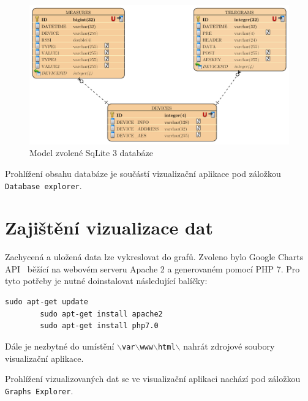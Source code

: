 \begin{figure}[!ht]
  \begin{center}
    \includegraphics[scale=0.55]{obrazky/aplikace_databaze}
  \end{center}
	\vspace{-10pt}
  \caption{Model zvolené SqLite 3 databáze}
	\label{databazovy_model}
\end{figure}

Prohlížení obsahu databáze je součástí vizualizační aplikace pod záložkou \texttt{Database explorer}.
	
\section{Zajištění vizualizace dat}	
\label{SectionVizualizaceDat}
Zachycená a uložená data lze vykreslovat do grafů. Zvoleno bylo Google Charts API~\cite{uvod_google_charts_api} běžící na webovém serveru Apache 2 a generovaném pomocí PHP 7. Pro tyto potřeby je nutné doinstalovat následující balíčky:
 
\begin{lstlisting}[style=MyCodeBash]
		sudo apt-get update
		sudo apt-get install apache2
		sudo apt-get install php7.0 
	\end{lstlisting}

Dále je nezbytné do umístění \texttt{$\backslash$var$\backslash$www$\backslash$html$\backslash$} nahrát zdrojové soubory visualizační aplikace. 

Prohlížení vizualizovaných dat se ve visualizační aplikaci nachází pod záložkou \texttt{Graphs Explorer}.

